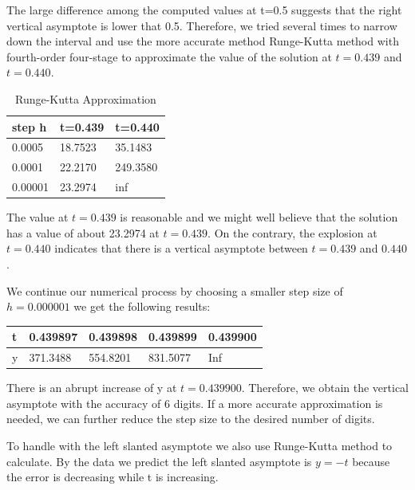 \documentclass[11pt,a4paper]{article}
\begin{document}
The large difference among the computed values at t=0.5 suggests that the right vertical asymptote is lower that 0.5. Therefore, we tried several times to narrow down the interval and use the more accurate method Runge-Kutta method with fourth-order four-stage to approximate the value of the solution at $t=0.439$ and $t=0.440$.

\begin{table}[H]
	\begin{center}
		\scriptsize
		\renewcommand{\arraystretch}{1.2}
		\begin{tabular}{l|l|l}
			step h  & t=0.439 & t=0.440  \\
			\hline
			0.0005  & 18.7523 & 35.1483  \\
			\hline
			0.0001  & 22.2170 & 249.3580 \\
			\hline
			0.00001 & 23.2974 & inf     
		\end{tabular}
		\setlength{\abovecaptionskip}{0.1cm}
		\setlength{\belowcaptionskip}{-0.9cm}
		\caption{Runge-Kutta Approximation}\label{tab:tab2.2.2}
	\end{center}
\end{table}

The value at $t=0.439$ is reasonable and we might well believe that the solution has a value of about 23.2974 at $t=0.439$. On the contrary, the explosion at $t=0.440$ indicates that there is a vertical asymptote between $t=0.439$ and $0.440$. 

We continue our numerical process by choosing a smaller step size of $h=0.000001$ we get the following results: 

\begin{table}[H]
	\centering
	\begin{tabular}{l|l|l|l|l}
	t & 0.439897 & 0.439898 & 0.439899 & 0.439900 \\
	\hline
	y & 371.3488 & 554.8201 & 831.5077 & Inf
	\end{tabular}
\end{table}

There is an abrupt increase of y at $t=0.439900$. Therefore, we obtain the vertical asymptote with the accuracy of 6 digits. If a more accurate approximation is needed, we can further reduce the step size to the desired number of digits. 

To handle with the left slanted asymptote we also use Runge-Kutta method to calculate. By the data we predict the left slanted asymptote is $y=-t$ because the error is decreasing while t is increasing.
\end{document}
